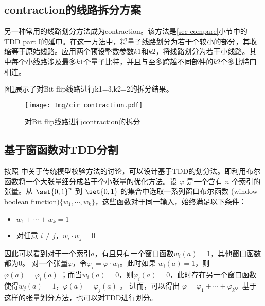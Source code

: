 \subsection*{contraction的线路拆分方案}
另一种常用的线路划分方法成为contraction。该方法是\ref{sec-compare}小节中的TDD part I的延申。在这一方法中，将量子线路划分为若干个较小的部分，其收缩等于原始线路。应用两个预设整数参数$k1$和$k2$，将线路划分为若干小线路。其中每个小线路涉及最多$k1$个量子比特，并且与至多跨越不同部件的$k2$个多比特门相连。
\begin{example}
    图\ref{fig:contraction}展示了对Bit flip线路进行k1=3,k2=2的拆分结果。
\begin{figure}[!htbp]
	\centering
	\texttt{[image: Img/cir\_contraction.pdf]}
	\caption{对Bit flip线路进行contraction的拆分}
	\label{fig:contraction}
\end{figure} 
\end{example}



\subsection*{基于窗函数对TDD分割}
按照 \citep{narayan1996partitioned} 中关于传统模型校验方法的讨论，可以设计基于TDD的划分法。即利用布尔函数将一个大张量细分成若干个小张量的优化方法。设 $\varphi$ 是一个含有 $n$ 个索引的张量。从 $\set{0,1}^n$ 到 $\set{0,1}$ 的集合中选取一系列窗口布尔函数 (window boolean function)$\{w_1,\cdots, w_k\}$，这些函数对于同一输入，始终满足以下条件： 
\begin{itemize}
    \item $w_1+\cdots +w_k=1$
    \item 对任意 $i \neq j$，$w_i \cdot w_j = 0$
\end{itemize} 
因此可以看到对于一个索引$a$，有且只有一个窗口函数$w_i (a) = 1$，其他窗口函数都为$0$。
对一个张量$\varphi$，令$\varphi_i=\varphi \cdot w_i$。此时如果 $w_i(a)=1$，则$\varphi(a)=\varphi_i(a)$ ；而当$w_i(a)=0$，则$\varphi_i(a)=0$，此时存在另一个窗口函数使得$w_j(a)=1$，$\varphi(a)=\varphi_j(a)$ 。
进而，可以得出 $\varphi = \varphi_1+ \cdots +\varphi_k$。基于这样的张量划分方法，也可以对TDD进行划分。

